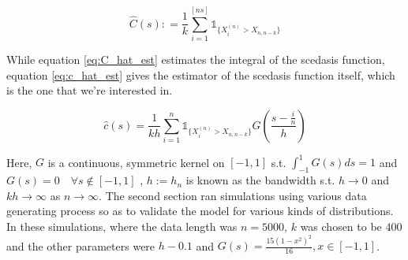 \documentclass[a4paper]{article}
\begin{document}
\begin{equation} \label{eq:C_hat_est}
\hat{C}(s) : = \frac{1}{k} \sum_{i=1}^{[ns]} \mathbb{1}_{\{X_i^{(n)} > X_{n,n-k}\}}
\end{equation}

While equation \ref{eq:C_hat_est} estimates the integral of the scedasis function, equation \ref{eq:c_hat_est} gives the estimator of the scedasis function itself, which is the one that we're interested in.

\begin{equation} \label{eq:c_hat_est}
\hat{c}(s) = \frac{1}{kh} \sum_{i=1}^n \mathbb{1}_{\{X_i^{(n)} > X_{n,n-k}\}}G(\frac{s-\frac{i}{n}}{h})
\end{equation}

Here, $G$ is a continuous, symmetric kernel on $[-1,1]$ s.t. $\int_{-1}^{1} G(s)ds = 1$ and $G(s) = 0 \quad \forall s \notin [-1,1]$ , $h := h_n$ is known as the bandwidth s.t. $h \rightarrow 0$ and $kh \rightarrow \infty$ as $n \rightarrow \infty$. The second section ran simulations using various data generating process so as to validate the model for various kinds of distributions. In these simulations, where the data length was $n=5000$, $k$ was chosen to be 400 and the other parameters were $h -0.1$ and $G(s) = \frac{15(1-x^2)^2}{16}, x \in [-1,1]$.
\end{document}
